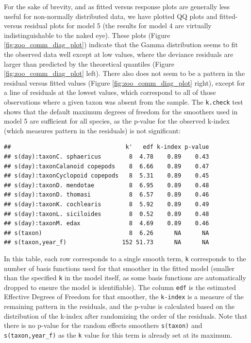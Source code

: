 \documentclass[12pt]{article}
\begin{document}
For the sake of brevity, and as fitted versus response plots are
generally less useful for non-normally distributed data, we have plotted
QQ plots and fitted-versus residual plots for model 5 (the results for
model 4 are virtually indistinguishable to the naked eye). These plots
(Figure \ref{fig:zoo_comm_diag_plot}) indicate that the Gamma
distribution seems to fit the observed data well except at low values,
where the deviance residuals are larger than predicted by the
theoretical quantiles (Figure \ref{fig:zoo_comm_diag_plot} left). There
also does not seem to be a pattern in the residual versus fitted values
(Figure \ref{fig:zoo_comm_diag_plot} right), except for a line of
residuals at the lowest values, which correspond to all of those
observations where a given taxon was absent from the sample. The
\texttt{k.check} test shows that the default maximum degrees of freedom
for the smoothers used in model 5 are sufficient for all species, as the
p-value for the observed k-index (which measures pattern in the
residuals) is not significant:

\begin{verbatim}
##                                 k'   edf k-index p-value
## s(day):taxonC. sphaericus        8  4.78    0.89    0.43
## s(day):taxonCalanoid copepods    8  6.66    0.89    0.47
## s(day):taxonCyclopoid copepods   8  5.31    0.89    0.45
## s(day):taxonD. mendotae          8  6.95    0.89    0.48
## s(day):taxonD. thomasi           8  6.57    0.89    0.46
## s(day):taxonK. cochlearis        8  5.92    0.89    0.49
## s(day):taxonL. siciloides        8  0.52    0.89    0.48
## s(day):taxonM. edax              8  4.69    0.89    0.46
## s(taxon)                         8  6.26      NA      NA
## s(taxon,year_f)                152 51.73      NA      NA
\end{verbatim}

In this table, each row corresponds to a single smooth term,
\texttt{k\textquotesingle{}} corresponds to the number of basis
functions used for that smoother in the fitted model (smaller than the
specified \texttt{k} in the model itself, as some basis functions are
automatically dropped to ensure the model is identifiable). The column
\texttt{edf} is the estimated Effective Degrees of Freedom for that
smoother, the \texttt{k-index} is a measure of the remaining pattern in
the residuals, and the p-value is calculated based on the distribution
of the k-index after randomizing the order of the residuals. Note that
there is no p-value for the random effects smoothers \texttt{s(taxon)}
and \texttt{s(taxon,year\_f)} as the \texttt{k} value for this term is
already set at its maximum.
\end{document}

